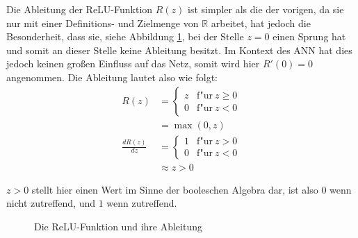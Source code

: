 \documentclass[12pt,titlepage]{article}
\begin{document}
Die Ableitung der ReLU-Funktion $R(z)$ ist simpler als die der vorigen, da sie nur mit einer Definitions- und Zielmenge von $\mathbb{R}$ arbeitet, hat jedoch die Besonderheit, dass sie, siehe Abbildung \ref{fig:drelu}, bei der Stelle $z = 0$ einen Sprung hat und somit an dieser Stelle keine Ableitung besitzt. Im Kontext des ANN hat dies jedoch keinen großen Einfluss auf das Netz, somit wird hier $R'(0)=0$ angenommen. Die Ableitung lautet also wie folgt:
\[
  \begin{aligned}
    R(z)             & = \begin{cases}
                           z & \text{f"ur} \ z \geq 0 \\
                           0 & \text{f"ur} \ z < 0
                         \end{cases} \\
                     & = \max(0, z)                 \\
    \frac{dR(z)}{dz} & = \begin{cases}
                           1 & \text{f"ur} \ z > 0 \\
                           0 & \text{f"ur} \ z < 0
                         \end{cases}    \\
                     & \approx z > 0
  \end{aligned}
\]

$z > 0$ stellt hier einen Wert im Sinne der booleschen Algebra dar, ist also $0$ wenn nicht zutreffend, und $1$ wenn zutreffend.

\begin{figure}[H]


  \caption{Die ReLU-Funktion und ihre Ableitung}
  \label{fig:drelu}
\end{figure}
\end{document}
